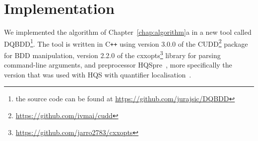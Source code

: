 \documentclass[
  digital, %
  color,
  twoside, %
  table,   %
  nolof,     %
  nolot,     %
]{fithesis3}
\theoremstyle{definition}
\theoremstyle{remark}
\newcommand{\vars}[1]{V_{#1}}
\newcommand{\prefix}[1]{Q({#1})}
\newcommand{\eprefix}[1]{Q_{\exists}(#1)}
\newcommand{\uprefix}[1]{Q_{\forall}(#1)}
\newcommand{\children}[1]{children({#1})}
\begin{document}
\begin{itemize}
\end{itemize}



\chapter{Implementation}
\label{chap:implementation}
\begin{sloppypar}
We implemented the algorithm of Chapter~\ref{chap:algorithm}a in a new tool called DQBDD\footnote{the source code can be found at \url{https://github.com/jurajsic/DQBDD}}. The tool is written in C\texttt{++} using version 3.0.0 of the CUDD\footnote{\url{https://github.com/ivmai/cudd}} package~\cite{CUDD} for BDD manipulation, version 2.2.0 of the cxxopts\footnote{\url{https://github.com/jarro2783/cxxopts}} library for parsing command-line arguments, and pre\-pro\-ces\-sor HQSpre~\cite{HQSpre2}, more specifically the version that was used with HQS with quantifier localisation~\cite{HQSquantifierLocalisation}.
\end{sloppypar}
\end{document}
